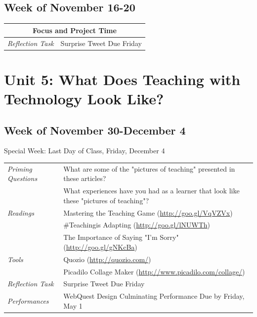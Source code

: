 \documentclass{tufte-handout}
\newcommand{\tabpq}{\faQuestionSign\medspace\textit{Priming Questions}}
\newcommand{\tabread}{\faBook\medspace\textit{Readings}}
\newcommand{\tabtools}{\faWrench\medspace\textit{Tools}}
\newcommand{\tabtweet}{\faLightbulb\medspace\textit{Reflection Task} & Surprise Tweet Due Friday \\}
\newcommand{\tabperformance}{\faTasks\medspace\textit{Performances}}
\newenvironment{tabsched}
	{\small
	\begin{tabular}{p{1.5in}p{5in}}
	\toprule}
	{\bottomrule
	\end{tabular}
	\normalsize}
\newenvironment{specweek}
	{\begin{center}
		\fontseries{b} \faBullhorn \medspace Special Week: }
		{\medspace \faBullhorn \fontseries{m}
	\end{center}}
\newcommand{\weekfourteen}{November 16-20}
\newcommand{\weekfifteen}{November 30-December 4}
\newcommand{\finisemester}{Last Day of Class, Friday, December 4}
\begin{document}
\subsection{Week of \weekfourteen}

\begin{tabsched}
	\multicolumn{2}{c}{\textbf{Focus and Project Time}} \\
	\midrule
	\tabtweet
\end{tabsched}

\section{Unit 5: What Does Teaching with Technology Look Like?}

\subsection{Week of \weekfifteen}

\begin{specweek}\finisemester\end{specweek}

\begin{tabsched}
	\tabpq & What are some of the "pictures of teaching" presented in these articles? \\
	& What experiences have you had as a learner that look like these "pictures of teaching"? \\
	\midrule
	\tabread & Mastering the Teaching Game (\url{http://goo.gl/VqVZVx}) \\
	& \#Teachingis Adapting (\url{http://goo.gl/lNUWTh}) \\
	& The Importance of Saying "I'm Sorry" (\url{http://goo.gl/gNKcBa}) \\
	\midrule
	\tabtools & Quozio (\url{http://quozio.com/}) \\
	& Picadilo Collage Maker (\url{http://www.picadilo.com/collage/}) \\
	\midrule
	\tabtweet
	\midrule
	\tabperformance & WebQuest Design Culminating Performance Due by Friday, May 1 \\
\end{tabsched}


\newpage



\newpage
\end{document}
